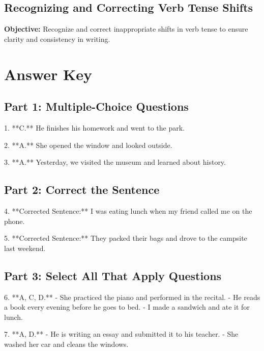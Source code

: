 \documentclass[12pt]{article}
\begin{document}
\subsection*{Recognizing and Correcting Verb Tense Shifts}
\onehalfspacing

\begin{tcolorbox}[colframe=black!40, colback=gray!0, title=Learning Objective]
\textbf{Objective:} Recognize and correct inappropriate shifts in verb tense to ensure clarity and consistency in writing.
\end{tcolorbox}





\section*{Answer Key}

\subsection*{Part 1: Multiple-Choice Questions}

1. **C.** He finishes his homework and went to the park.

2. **A.** She opened the window and looked outside.

3. **A.** Yesterday, we visited the museum and learned about history.

\subsection*{Part 2: Correct the Sentence}

4. **Corrected Sentence:** I was eating lunch when my friend called me on the phone.

5. **Corrected Sentence:** They packed their bags and drove to the campsite last weekend.

\subsection*{Part 3: Select All That Apply Questions}

6. **A, C, D.**  
   - She practiced the piano and performed in the recital.  
   - He reads a book every evening before he goes to bed.  
   - I made a sandwich and ate it for lunch.

7. **A, D.**  
   - He is writing an essay and submitted it to his teacher.  
   - She washed her car and cleans the windows.
\end{document}
